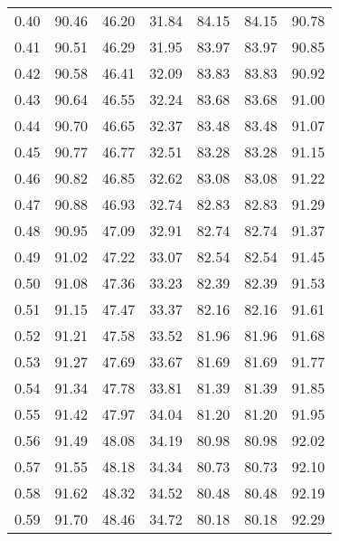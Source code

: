 \begin{tabular}{|c|c|c|c|c|c|c|}
      0.40 &     90.46 &     46.20 &      31.84 &   84.15 &      84.15 &         90.78 \\
      0.41 &     90.51 &     46.29 &      31.95 &   83.97 &      83.97 &         90.85 \\
      0.42 &     90.58 &     46.41 &      32.09 &   83.83 &      83.83 &         90.92 \\
      0.43 &     90.64 &     46.55 &      32.24 &   83.68 &      83.68 &         91.00 \\
      0.44 &     90.70 &     46.65 &      32.37 &   83.48 &      83.48 &         91.07 \\
      0.45 &     90.77 &     46.77 &      32.51 &   83.28 &      83.28 &         91.15 \\
      0.46 &     90.82 &     46.85 &      32.62 &   83.08 &      83.08 &         91.22 \\
      0.47 &     90.88 &     46.93 &      32.74 &   82.83 &      82.83 &         91.29 \\
      0.48 &     90.95 &     47.09 &      32.91 &   82.74 &      82.74 &         91.37 \\
      0.49 &     91.02 &     47.22 &      33.07 &   82.54 &      82.54 &         91.45 \\
      0.50 &     91.08 &     47.36 &      33.23 &   82.39 &      82.39 &         91.53 \\
      0.51 &     91.15 &     47.47 &      33.37 &   82.16 &      82.16 &         91.61 \\
      0.52 &     91.21 &     47.58 &      33.52 &   81.96 &      81.96 &         91.68 \\
      0.53 &     91.27 &     47.69 &      33.67 &   81.69 &      81.69 &         91.77 \\
      0.54 &     91.34 &     47.78 &      33.81 &   81.39 &      81.39 &         91.85 \\
      0.55 &     91.42 &     47.97 &      34.04 &   81.20 &      81.20 &         91.95 \\
      0.56 &     91.49 &     48.08 &      34.19 &   80.98 &      80.98 &         92.02 \\
      0.57 &     91.55 &     48.18 &      34.34 &   80.73 &      80.73 &         92.10 \\
      0.58 &     91.62 &     48.32 &      34.52 &   80.48 &      80.48 &         92.19 \\
      0.59 &     91.70 &     48.46 &      34.72 &   80.18 &      80.18 &         92.29 \\

\end{tabular}
